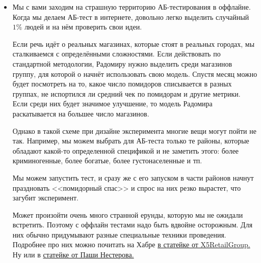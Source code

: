 \documentclass[12pt, a4paper, oneside]{article}
\theoremstyle{plain} %
\theoremstyle{definition}
\begin{document}
\begin{solution}
\begin{itemize}
\item Мы с вами заходим на страшную территорию АБ-тестирования в оффлайне. Когда мы делаем АБ-тест в интернете, довольно легко выделить случайный $1\%$ людей и на нём проверить свои идеи. 

Если речь идёт о реальных магазинах, которые стоят в реальных городах, мы сталкиваемся с определёнными сложностями. Если действовать по стандартной методологии, Радомиру нужно выделить среди магазинов группу, для которой о начнёт использовать свою модель. Спустя месяц можно будет посмотреть на то, какое число помидоров списывается в разных группах, не испортился ли средний чек по помидорам и другие метрики. Если среди них будет значимое улучшение, то  модель Радомира раскатывается на большее число магазинов. 

Однако в такой схеме при дизайне эксперимента многие вещи могут пойти не так. Например, мы можем выбрать для АБ-теста только те районы, которые обладают какой-то определенной спецификой и не заметить этого: более криминогенные, более богатые, более густонаселенные и тп.

Мы можем запустить тест, и сразу же с его запуском в части районов начнут праздновать <<помидорный спас>> и спрос на них резко вырастет, что загубит эксперимент. 

Может произойти очень много странной ерунды, которую мы не ожидали встретить. Поэтому с оффлайн тестами надо быть вдвойне осторожным. Для них обычно придумывают разные специальные техники проведения. Подробнее про них можно почитать на Хабре \href{https://habr.com/ru/company/X5RetailGroup/blog/466349/}{в статейке от X5RetailGroup.} Ну или в \href{https://habr.com/ru/company/ods/blog/416101/}{статейке от Паши Нестерова.}
\end{itemize}
\end{solution} 
\end{document}
